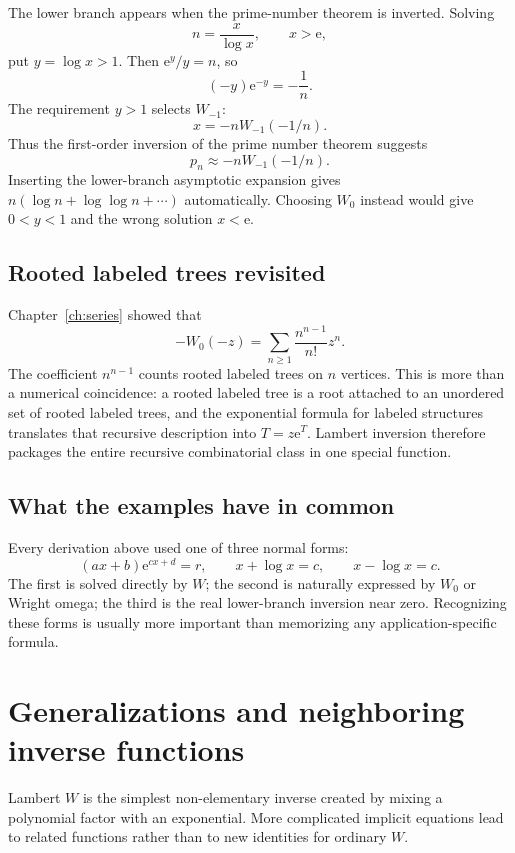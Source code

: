 \documentclass[11pt,oneside]{book}
\theoremstyle{definition}
\theoremstyle{remark}
\newcommand{\ee}{\mathrm e}
\begin{document}
The lower branch appears when the prime-number theorem is inverted.  Solving
\[
 n=\frac{x}{\log x},
 \qquad x>\ee,
\]
put $y=\log x>1$.  Then $\ee^y/y=n$, so
\[
 (-y)\ee^{-y}=-\frac1n.
\]
The requirement $y>1$ selects $W_{-1}$:
\begin{equation}\label{eq:nthprimeW}
 \boxed{
 x=-nW_{-1}(-1/n).}
\end{equation}
Thus the first-order inversion of the prime number theorem suggests
\begin{equation}\label{eq:nthprimeapprox}
 p_n\approx-nW_{-1}(-1/n).
\end{equation}
Inserting the lower-branch asymptotic expansion gives
$n(\log n+\log\log n+\cdots)$ automatically.  Choosing $W_0$ instead would
give $0<y<1$ and the wrong solution $x<\ee$.

\section{Rooted labeled trees revisited}

Chapter~\ref{ch:series} showed that
\[
 -W_0(-z)=\sum_{n\ge1}\frac{n^{n-1}}{n!}z^n.
\]
The coefficient $n^{n-1}$ counts rooted labeled trees on $n$ vertices.  This
is more than a numerical coincidence: a rooted labeled tree is a root
attached to an unordered set of rooted labeled trees, and the exponential
formula for labeled structures translates that recursive description into
$T=z\ee^T$.  Lambert inversion therefore packages the entire recursive
combinatorial class in one special function.

\section{What the examples have in common}

Every derivation above used one of three normal forms:
\[
 (ax+b)\ee^{cx+d}=r,
 \qquad
 x+\log x=c,
 \qquad
 x-\log x=c.
\]
The first is solved directly by $W$; the second is naturally expressed by
$W_0$ or Wright omega; the third is the real lower-branch inversion near
zero.  Recognizing these forms is usually more important than memorizing any
application-specific formula.


\chapter{Generalizations and neighboring inverse functions}
\label{ch:generalizations}

Lambert $W$ is the simplest non-elementary inverse created by mixing a
polynomial factor with an exponential.  More complicated implicit equations
lead to related functions rather than to new identities for ordinary $W$.
\end{document}
